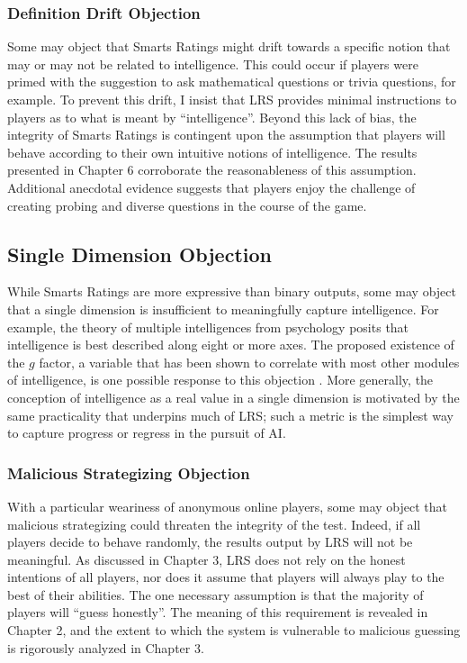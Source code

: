 \subsubsection{Definition Drift Objection}

Some may object that Smarts Ratings might drift towards a specific notion that may or may not be related to intelligence. This could occur if players were primed with the suggestion to ask mathematical questions or trivia questions, for example. To prevent this drift, I insist that LRS provides minimal instructions to players as to what is meant by ``intelligence''. Beyond this lack of bias, the integrity of Smarts Ratings is contingent upon the assumption that players will behave according to their own intuitive notions of intelligence. The results presented in Chapter 6 corroborate the reasonableness of this assumption. Additional anecdotal evidence suggests that players enjoy the challenge of creating probing and diverse questions in the course of the game.

\subsection{Single Dimension Objection}

While Smarts Ratings are more expressive than binary outputs, some may object that a single dimension is insufficient to meaningfully capture intelligence. For example, the theory of multiple intelligences from psychology posits that intelligence is best described along eight or more axes\cite{gardner2011frames}. The proposed existence of the $g$ factor, a variable that has been shown to correlate with most other modules of intelligence, is one possible response to this objection \cite{visser2006g}. More generally, the conception of intelligence as a real value in a single dimension is motivated by the same practicality that underpins much of LRS; such a metric is the simplest way to capture progress or regress in the pursuit of AI.

\subsubsection{Malicious Strategizing Objection}

With a particular weariness of anonymous online players, some may object that malicious strategizing could threaten the integrity of the test. Indeed, if all players decide to behave randomly, the results output by LRS will not be meaningful. As discussed in Chapter 3, LRS does not rely on the honest intentions of all players, nor does it assume that players will always play to the best of their abilities. The one necessary assumption is that the majority of players will ``guess honestly''. The meaning of this requirement is revealed in Chapter 2, and the extent to which the system is vulnerable to malicious guessing is rigorously analyzed in Chapter 3.

